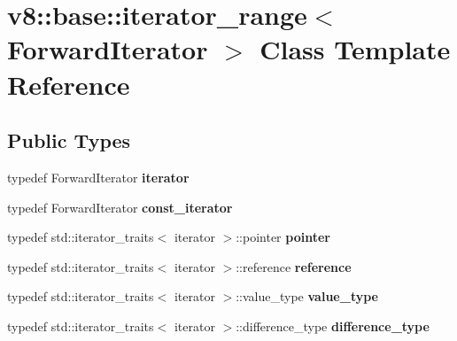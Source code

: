 \hypertarget{classv8_1_1base_1_1iterator__range}{}\section{v8\+:\+:base\+:\+:iterator\+\_\+range$<$ Forward\+Iterator $>$ Class Template Reference}
\label{classv8_1_1base_1_1iterator__range}
\subsection*{Public Types}
\begin{DoxyCompactItemize}
\item 
typedef Forward\+Iterator {\bfseries iterator}\hypertarget{classv8_1_1base_1_1iterator__range_a61cc56d8d64ba12fd0817aa7cd3f8347}{}\label{classv8_1_1base_1_1iterator__range_a61cc56d8d64ba12fd0817aa7cd3f8347}

\item 
typedef Forward\+Iterator {\bfseries const\+\_\+iterator}\hypertarget{classv8_1_1base_1_1iterator__range_a5ac9de16cf9b52d1d6f98ef3fc82541b}{}\label{classv8_1_1base_1_1iterator__range_a5ac9de16cf9b52d1d6f98ef3fc82541b}

\item 
typedef std\+::iterator\+\_\+traits$<$ iterator $>$\+::pointer {\bfseries pointer}\hypertarget{classv8_1_1base_1_1iterator__range_aacad6428c687d06eab71bc6b50387f3b}{}\label{classv8_1_1base_1_1iterator__range_aacad6428c687d06eab71bc6b50387f3b}

\item 
typedef std\+::iterator\+\_\+traits$<$ iterator $>$\+::reference {\bfseries reference}\hypertarget{classv8_1_1base_1_1iterator__range_abc1cf03db6e2b6e2c0ea5231056e65cf}{}\label{classv8_1_1base_1_1iterator__range_abc1cf03db6e2b6e2c0ea5231056e65cf}

\item 
typedef std\+::iterator\+\_\+traits$<$ iterator $>$\+::value\+\_\+type {\bfseries value\+\_\+type}\hypertarget{classv8_1_1base_1_1iterator__range_a29bd93eb88f1c07be24d6bad30dfb2f0}{}\label{classv8_1_1base_1_1iterator__range_a29bd93eb88f1c07be24d6bad30dfb2f0}

\item 
typedef std\+::iterator\+\_\+traits$<$ iterator $>$\+::difference\+\_\+type {\bfseries difference\+\_\+type}\hypertarget{classv8_1_1base_1_1iterator__range_aa36c681ac7921849ea7b71f3668f4234}{}\label{classv8_1_1base_1_1iterator__range_aa36c681ac7921849ea7b71f3668f4234}

\end{DoxyCompactItemize}
